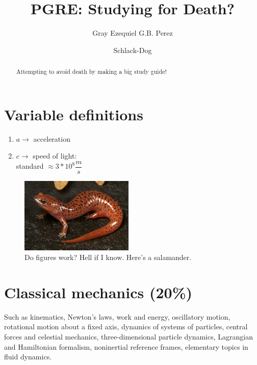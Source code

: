 \documentclass[%
 reprint,
superscriptaddress,
 amsmath,amssymb,
 aps,
prc,
]{revtex4-1}
\begin{document}

\title{PGRE: Studying for Death?}%

\author{Gray Ezequiel G.B. Perez}
\author{Schlack-Dog}
%

\begin{abstract}
Attempting to avoid death by making a big study guide!
\end{abstract}
\maketitle
\tableofcontents
\section{Variable definitions}
\begin{enumerate}
\item[] $a\rightarrow$ acceleration

\item[] $c\rightarrow$ speed of light:\\
standard  $\approx 3*10^8\dfrac{m}{s}$
\end{enumerate}

\begin{figure}[t]
	\centering
	\includegraphics[width=0.48\textwidth]{figures/sally}
	\caption{Do figures work? Hell if I know. Here's a salamander.}
	\label{fig:sally}
\end{figure}

\section{Classical mechanics (20\%)}
Such as kinematics, Newton's laws, work and energy, oscillatory motion, rotational motion about a fixed axis, dynamics of systems of particles, central forces and celestial mechanics, three-dimensional particle dynamics, Lagrangian and Hamiltonian formalism, noninertial reference frames, elementary topics in fluid dynamics.
\end{document}
